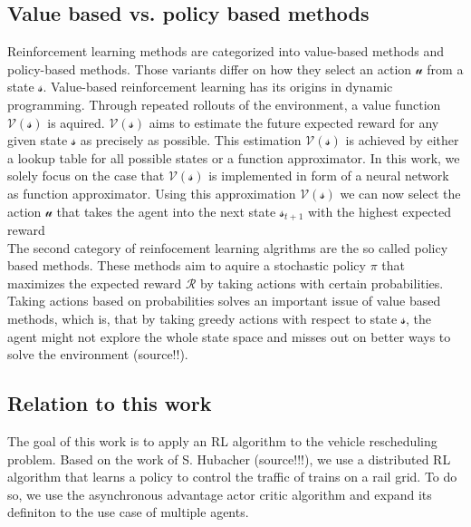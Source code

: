 \subsection*{Value based vs. policy based methods}\label{value_policy_based_methods}
Reinforcement learning methods are categorized into value-based methods and policy-based methods. Those variants differ on how they select an action $\mathcal{u}$ from a state $\mathcal{s}$.
Value-based reinforcement learning has its origins in dynamic programming. Through repeated rollouts of the environment, a value function $\mathcal{V(s)}$
is aquired. $\mathcal{V(s)}$ aims to estimate the future expected reward for any given state $\mathcal{s}$ as precisely as possible. This estimation $\mathcal{V(s)}$ is achieved by either a lookup table for all possible states or a function approximator. In this work, we solely focus on the case that $\mathcal{V(s)}$ is implemented in form of a neural network as function approximator. Using this approximation $\mathcal{V(s)}$ we can now select the action $\mathcal{u}$ that takes the agent into the next state $\mathcal{s}_{t+1}$ with the highest expected reward \\
The second category of reinfocement learning algrithms are the so called policy based methods. These methods aim to aquire a stochastic policy $\pi$ that maximizes the expected reward $\mathcal{R}$ by taking actions with certain probabilities. Taking actions based on probabilities solves an important issue of value based methods, which is, that by taking greedy actions with respect to state  $\mathcal{s}$, the agent might not explore the whole state space and misses out on better ways to solve the environment (source!!).
\subsection*{Relation to this work}\label{rl_relation_work}
The goal of this work is to apply an RL algorithm to the vehicle rescheduling problem. Based on the work of S. Hubacher (source!!!), we use a distributed RL algorithm that learns a policy to control the traffic of trains on a rail grid. To do so, we use the asynchronous advantage actor critic algorithm and expand its definiton to the use case of multiple agents.

